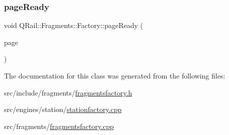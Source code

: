 \mbox{\label{classQRail_1_1Fragments_1_1Factory_a1ba7147390ac01a41fd82412468d64fa}} 
\subsubsection{\texorpdfstring{pageReady}{pageReady}}
{\footnotesize\ttfamily void Q\+Rail\+::\+Fragments\+::\+Factory\+::page\+Ready (\begin{DoxyParamCaption}\item[{\mbox{\hyperlink{classQRail_1_1Fragments_1_1Page}{Q\+Rail\+::\+Fragments\+::\+Page}} $\ast$}]{page }\end{DoxyParamCaption})\hspace{0.3cm}{\ttfamily [signal]}}



The documentation for this class was generated from the following files\+:\begin{DoxyCompactItemize}
\item 
src/include/fragments/\mbox{\hyperlink{fragmentsfactory_8h}{fragmentsfactory.\+h}}\item 
src/engines/station/\mbox{\hyperlink{stationfactory_8cpp}{stationfactory.\+cpp}}\item 
src/fragments/\mbox{\hyperlink{fragmentsfactory_8cpp}{fragmentsfactory.\+cpp}}\end{DoxyCompactItemize}
